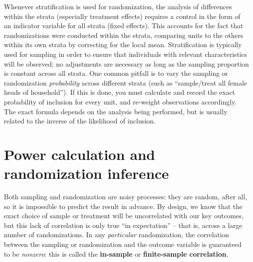 Whenever stratification is used for randomization,
the analysis of differences within the strata (especially treatment effects)
requires a control in the form of an indicator variable for all strata (fixed effects).
This accounts for the fact that randomizations were conducted within the strata,
comparing units to the others within its own strata by correcting for the local mean.
Stratification is typically used for sampling
in order to ensure that individuals with relevant characteristics will be observed;
no adjustments are necessary as long as the sampling proportion is constant across all strata.
One common pitfall is to vary the sampling or randomization \textit{probability}
across different strata (such as ``sample/treat all female heads of household'').
If this is done, you must calculate and record the exact probability
of inclusion for every unit, and re-weight observations accordingly.
The exact formula depends on the analysis being performed,
but is usually related to the inverse of the likelihood of inclusion.



\section{Power calculation and randomization inference}

Both sampling and randomization are noisy processes:
they are random, after all, so it is impossible to predict the result in advance.
By design, we know that the exact choice of sample or treatment
will be uncorrelated with our key outcomes,
but this lack of correlation is only true ``in expectation'' --
that is, across a large number of randomizations.
In any \textit{particular} randomization,
the correlation between the sampling or randomization and the outcome variable
is guaranteed to be \textit{nonzero}:
this is called the \textbf{in-sample} or \textbf{finite-sample correlation}.

